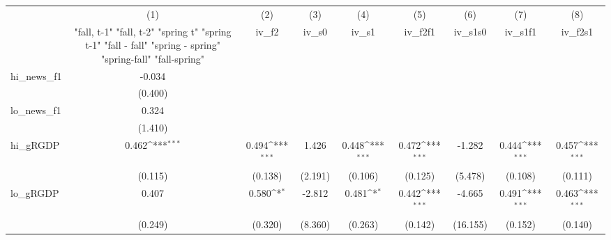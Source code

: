 {
\def\sym#1{\ifmmode^{#1}\else\(^{#1}\)\fi}
\begin{tabular}{l*{8}{c}}
\toprule
            &\multicolumn{1}{c}{(1)}&\multicolumn{1}{c}{(2)}&\multicolumn{1}{c}{(3)}&\multicolumn{1}{c}{(4)}&\multicolumn{1}{c}{(5)}&\multicolumn{1}{c}{(6)}&\multicolumn{1}{c}{(7)}&\multicolumn{1}{c}{(8)}\\
            &\multicolumn{1}{c}{  "fall, t-1" "fall, t-2" "spring t" "spring t-1"  "fall - fall" "spring - spring" "spring-fall" "fall-spring" }&\multicolumn{1}{c}{iv\_f2}&\multicolumn{1}{c}{iv\_s0}&\multicolumn{1}{c}{iv\_s1}&\multicolumn{1}{c}{iv\_f2f1}&\multicolumn{1}{c}{iv\_s1s0}&\multicolumn{1}{c}{iv\_s1f1}&\multicolumn{1}{c}{iv\_f2s1}\\
\midrule
hi\_news\_f1  &      -0.034         &                     &                     &                     &                     &                     &                     &                     \\
            &     (0.400)         &                     &                     &                     &                     &                     &                     &                     \\
\addlinespace
lo\_news\_f1  &       0.324         &                     &                     &                     &                     &                     &                     &                     \\
            &     (1.410)         &                     &                     &                     &                     &                     &                     &                     \\
\addlinespace
hi\_gRGDP    &       0.462\sym{***}&       0.494\sym{***}&       1.426         &       0.448\sym{***}&       0.472\sym{***}&      -1.282         &       0.444\sym{***}&       0.457\sym{***}\\
            &     (0.115)         &     (0.138)         &     (2.191)         &     (0.106)         &     (0.125)         &     (5.478)         &     (0.108)         &     (0.111)         \\
\addlinespace
lo\_gRGDP    &       0.407         &       0.580\sym{*}  &      -2.812         &       0.481\sym{*}  &       0.442\sym{***}&      -4.665         &       0.491\sym{***}&       0.463\sym{***}\\
            &     (0.249)         &     (0.320)         &     (8.360)         &     (0.263)         &     (0.142)         &    (16.155)         &     (0.152)         &     (0.140)         \\

\end{tabular}}
